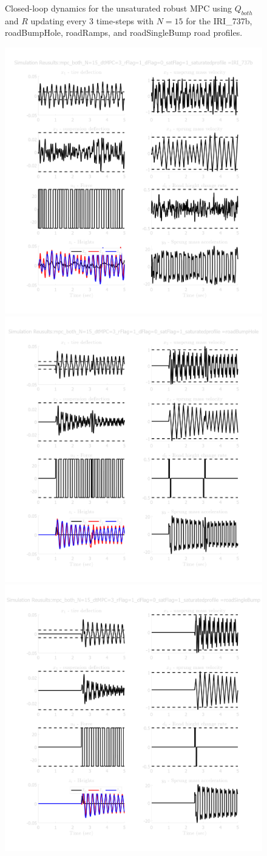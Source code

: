 \documentclass[onecolumn]{IEEEtran}
\begin{document}
\begin{figure}[!h]
    \caption{Closed-loop dynamics for the unsaturated robust MPC using $Q_{both}$ and $R$ updating every 3 time-steps with $N=15$ for the IRI\_737b, roadBumpHole, roadRamps, and roadSingleBump road profiles.} \label{fig:mpc_N15_dt3_d0_r1_sat0}
\end{figure}


\begin{figure}[!h]
    \centering
    \includegraphics[width = 0.49 \columnwidth]{figs/results_mpc_both_N=15_dtMPC=3_rFlag=1_dFlag=0_satFlag=1_saturated_IRI_737b.png}
    \includegraphics[width = 0.49 \columnwidth]{figs/results_mpc_both_N=15_dtMPC=3_rFlag=1_dFlag=0_satFlag=1_saturated_roadBumpHole.png}
    \includegraphics[width = 0.49 \columnwidth]{figs/results_mpc_both_N=15_dtMPC=3_rFlag=1_dFlag=0_satFlag=1_saturated_roadSingleBump.png}

\end{figure}
\end{document}
